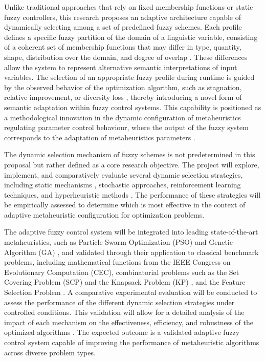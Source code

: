 Unlike traditional approaches that rely on fixed membership functions or static fuzzy controllers, this research proposes an adaptive architecture capable of dynamically selecting among a set of predefined fuzzy schemes. Each profile defines a specific fuzzy partition of the domain of a linguistic variable, consisting of a coherent set of membership functions that may differ in type, quantity, shape, distribution over the domain, and degree of overlap \parencite{sadollah2018introductory, pedrycz2015designing}. These differences allow the system to represent alternative semantic interpretations of input variables. The selection of an appropriate fuzzy profile during runtime is guided by the observed behavior of the optimization algorithm, such as stagnation, relative improvement, or diversity loss \parencite{castillo2017dynamic, patel2022type}, thereby introducing a novel form of semantic adaptation within fuzzy control systems. This capability is positioned as a methodological innovation in the dynamic configuration of metaheuristics regulating parameter control behaviour, where the output of the fuzzy system corresponds to the adaptation of metaheuristics parameters \parencite{valdez2014survey, diaz2017new}.

The dynamic selection mechanism of fuzzy schemes is not predetermined in this proposal but rather defined as a core research objective. The project will explore, implement, and comparatively evaluate several dynamic selection strategies, including static mechanisms \parencite{cord2001genetic}, stochastic approaches, reinforcement learning techniques, and hyperheuristic methods \parencite{qiu2020event, zhu2020event, haighton2024adaptable, burke2010classification, crawford2012dynamic}. The performance of these strategies will be empirically assessed to determine which is most effective in the context of adaptive metaheuristic configuration for optimization problems.

The adaptive fuzzy control system will be integrated into leading state-of-the-art metaheuristics, such as Particle Swarm Optimization (PSO) and Genetic Algorithm (GA) \parencite{valdez2014survey}, and validated through their application to classical benchmark problems, including mathematical functions from the IEEE Congress on Evolutionary Computation (CEC), combinatorial problems such as the Set Covering Problem (SCP) and the Knapsack Problem (KP) \parencite{fatih2006particle, chatterjee2024solving}, and the Feature Selection Problem \parencite{sadollah2018introductory}. A comparative experimental evaluation will be conducted to assess the performance of the different dynamic selection strategies under controlled conditions. This validation will allow for a detailed analysis of the impact of each mechanism on the effectiveness, efficiency, and robustness of the optimized algorithms \parencite{halim2021performance, djebedjian2021global, crawford2021q}. The expected outcome is a validated adaptive fuzzy control system capable of improving the performance of metaheuristic algorithms across diverse problem types.


